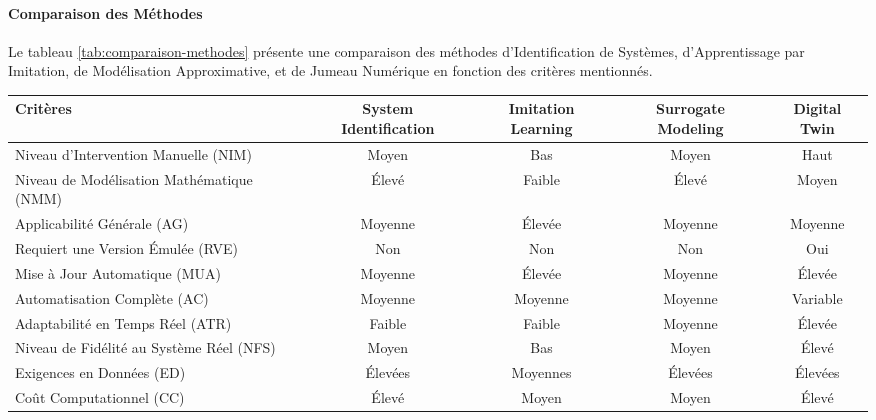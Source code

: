 \documentclass[sigconf,anonymous]{aamas}
\begin{document}
\paragraph{Comparaison des Méthodes}

Le tableau \ref{tab:comparaison-methodes} présente une comparaison des méthodes d'Identification de Systèmes, d'Apprentissage par Imitation, de Modélisation Approximative, et de Jumeau Numérique en fonction des critères mentionnés.


\begin{table*}[h!]
\centering
\caption{Comparaison des méthodes de modélisation automatisée selon différents critères}
\begin{tabular}{|p{5cm}|c|c|c|c|}
\hline
\textbf{Critères}                   & \textbf{System Identification} & \textbf{Imitation Learning} & \textbf{Surrogate Modeling} & \textbf{Digital Twin} \\
\hline
Niveau d'Intervention Manuelle (NIM)    & Moyen                         & Bas                          & Moyen                       & Haut                 \\
Niveau de Modélisation Mathématique (NMM) & Élevé                         & Faible                       & Élevé                       & Moyen                \\
Applicabilité Générale (AG)             & Moyenne                       & Élevée                       & Moyenne                     & Moyenne              \\
Requiert une Version Émulée (RVE)       & Non                           & Non                          & Non                         & Oui                  \\
Mise à Jour Automatique (MUA)           & Moyenne                       & Élevée                       & Moyenne                     & Élevée               \\
Automatisation Complète (AC)            & Moyenne                       & Moyenne                      & Moyenne                     & Variable             \\
Adaptabilité en Temps Réel (ATR)        & Faible                        & Faible                       & Moyenne                     & Élevée               \\
Niveau de Fidélité au Système Réel (NFS) & Moyen                         & Bas                          & Moyen                       & Élevé                \\
Exigences en Données (ED)               & Élevées                       & Moyennes                     & Élevées                     & Élevées              \\
Coût Computationnel (CC)                & Élevé                         & Moyen                        & Moyen                       & Élevé                \\
\hline
\end{tabular}
\label{tab:comparaison-methodes}
\end{table*}
\end{document}
